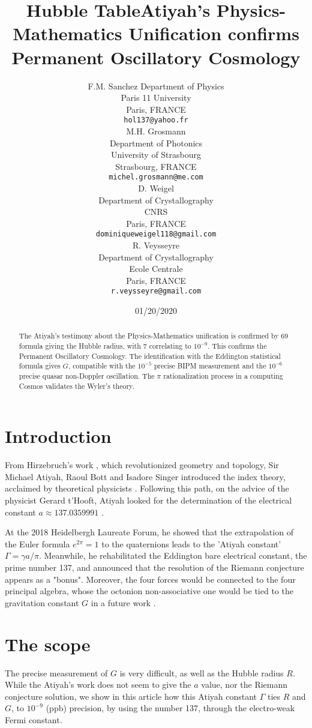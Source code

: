 \documentclass[a4paper,9pt]{article}
\title{Hubble Table}
\date{01/20/2020}
\title{Atiyah's Physics-Mathematics Unification confirms Permanent Oscillatory Cosmology}
\author{
  F.M. Sanchez
  Department of Physics\\
  Paris 11 University\\
  Paris, FRANCE \\
  \texttt{hol137@yahoo.fr} \\
   \And
 M.H. Grosmann \\
  Department of Photonics\\
  University of Strasbourg\\
  Strasbourg, FRANCE \\
  \texttt{michel.grosmann@me.com} \\
   \And
 D. Weigel \\
  Department of Crystallography\\
  CNRS\\
  Paris, FRANCE \\
  \texttt{dominiqueweigel118@gmail.com} \\
   \And
 R. Veysseyre \\
  Department of Crystallography\\
  Ecole Centrale\\
  Paris, FRANCE \\
  \texttt{r.veysseyre@gmail.com} \\
}
\begin{document}
\maketitle

\begin{abstract}
The Atiyah's testimony about the Physics-Mathematics unification is confirmed by 69 formula
giving the Hubble radius, with 7 correlating to $10^{-9}$. This confirms the Permanent Oscillatory
Cosmology. The identification with the Eddington statistical formula gives $G$, compatible with the
$10^{-5}$ precise BIPM measurement and the $10^{-6}$ precise quasar non-Doppler oscillation. The $\pi$ rationalization process in a computing Cosmos validates the Wyler's theory.

\end{abstract}





\label{sec:headings}

\section{Introduction}



  
    From Hirzebruch's work \cite{Hirzebruch}, which revolutionized geometry and topology, Sir Michael Atiyah, Raoul Bott \cite{Bott} and Isadore Singer \cite{Singer} introduced the  index theory, acclaimed by theoretical physicists \cite{Alvarez}. Following this path, on the advice of the physicist Gerard t'Hooft, Atiyah looked for the determination of the electrical constant $a \approx 137.0359991$ \cite{Atiyah}.
    
    
    At the 2018 Heidelbergh Laureate Forum, he showed that the extrapolation of the Euler formula  $e^{2\pi} = 1$ to the quaternions leads to the 'Atiyah constant' $\Gamma = \gamma a/\pi $. Meanwhile, he rehabilitated the Eddington bare electrical constant, the prime number 137, and announced that the resolution of the Riemann conjecture appears as a "bonus". Moreover, the four forces would be connected to the four principal algebra, whose the octonion non-associative one would be tied to the gravitation constant $G$ in a future work \cite{Atiyah}. 

\section{The scope}
   The precise measurement of $G$ is very difficult, as well as the Hubble radius $R$. While the Atiyah's work does not seem to give the $a$ value, nor the Riemann conjecture solution, we show in this article how this Atiyah constant $\Gamma$ ties $R$ and $G$, to $10^{-9}$ (ppb) precision, by using the number 137, through the electro-weak Fermi constant.
   
\end{document}
